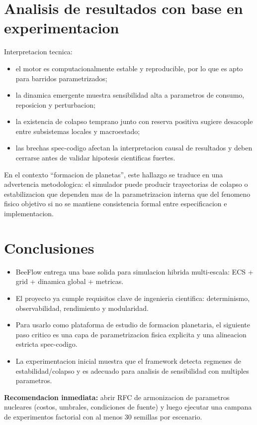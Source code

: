 \documentclass[11pt]{article}
\begin{document}
\section*{Analisis de resultados con base en experimentacion}

Interpretacion tecnica:

\begin{itemize}
  \item el motor es computacionalmente estable y reproducible, por lo que es apto para barridos parametrizados;
  \item la dinamica emergente muestra sensibilidad alta a parametros de consumo, reposicion y perturbacion;
  \item la existencia de colapso temprano junto con reserva positiva sugiere desacople entre subsistemas locales y macroestado;
  \item las brechas spec-codigo afectan la interpretacion causal de resultados y deben cerrarse antes de validar hipotesis cientificas fuertes.
\end{itemize}

En el contexto ``formacion de planetas'', este hallazgo se traduce en una advertencia metodologica: el simulador puede producir trayectorias de colapso o estabilizacion que dependen mas de la parametrizacion interna que del fenomeno fisico objetivo si no se mantiene consistencia formal entre especificacion e implementacion.

\section*{Conclusiones}

\begin{itemize}
  \item BeeFlow entrega una base solida para simulacion hibrida multi-escala: ECS + grid + dinamica global + metricas.
  \item El proyecto ya cumple requisitos clave de ingenieria cientifica: determinismo, observabilidad, rendimiento y modularidad.
  \item Para usarlo como plataforma de estudio de formacion planetaria, el siguiente paso critico es una capa de parametrizacion fisica explicita y una alineacion estricta spec-codigo.
  \item La experimentacion inicial muestra que el framework detecta regmenes de estabilidad/colapso y es adecuado para analisis de sensibilidad con multiples parametros.
\end{itemize}

\textbf{Recomendacion inmediata:} abrir RFC de armonizacion de parametros nucleares (costos, umbrales, condiciones de fuente) y luego ejecutar una campana de experimentos factorial con al menos 30 semillas por escenario.
\end{document}
